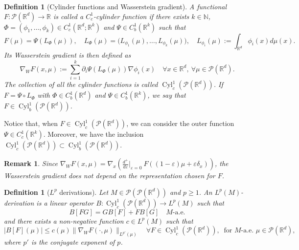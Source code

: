\documentclass[10pt,leqno]{amsart}
\numberwithin{equation}{section}
\newtheorem{df}[teorema]{Definition}
\newtheorem{oss}[teorema]{Remark}
\newcommand{\R}{\mathbb{R}}
\newcommand{\N}{\mathbb{N}}
\newcommand{\PP}{\mathcal{P}}
\begin{document}
\begin{df}[Cylinder functions and Wasserstein gradient]\label{def cyl func and wass grad}
    A functional $F:\PP(\R^d)\to\R$ is called a $C^1_c$-cylinder function if there exists $k\in \N$, $\Phi = (\phi_1,\dots,\phi_k)\in C^1_c(\R^d;\R^k)$ and $\Psi\in C^1_b(\R^k)$ such that 
    \begin{equation}\label{cyl functions}
        F(\mu) = \Psi\left( L_\Phi(\mu) \right), \quad L_\Phi(\mu) =  \big(L_{\phi_1}(\mu) ,\dots , L_{\phi_k}(\mu)\big), \quad  L_{\phi_i}(\mu) := \int_{\R^d} \phi_i(x) d\mu(x).
    \end{equation}
    Its Wasserstein gradient is then defined as 
    \begin{equation}\label{wass gradient cyl}
        \nabla_W F(x,\mu):= \sum_{i=1}^k \partial_{i}\Psi\left( L_{\Phi}(\mu)\right) \nabla \phi_i(x) \quad \forall x\in \R^d, \ \forall\mu \in \PP(\R^d).
    \end{equation}
    The collection of all the cylinder functions is called $\operatorname{Cyl}^1_c(\PP(\R^d))$. If $F = \Psi\circ L_\Phi$ with $\Phi \in C_b^1(\R^d)$ and $\Psi \in C_b^1(\R^k)$, we say that $F \in \operatorname{Cyl}^1_b(\PP(\R^d))$. 
\end{df}



Notice that, when $F\in \operatorname{Cyl}^1_c(\PP(\R^d))$, we can consider the outer function $\Psi \in C_c^1(\R^k)$. Moreover, we have the inclusion $\operatorname{Cyl}^1_c(\PP(\R^d))\subset \operatorname{Cyl}^1_b(\PP(\R^d)).$

\begin{oss}
    Since $\nabla_W F(x,\mu) = \nabla_x \left(\frac{d^+}{d\varepsilon}|_{\varepsilon=0} \ F((1-\varepsilon)\mu+ \varepsilon\delta_x)\right)$, the Wasserstein gradient does not depend on the representation chosen for $F$.
\end{oss}












\begin{df}[$L^p$ derivations]\label{def derivations}
    Let $M\in \PP(\PP(\R^d))$ and $p\geq 1$. An $L^p(M)$-derivation is a linear operator $B:\operatorname{Cyl}_c^1(\PP(\R^d))\to L^p(M)$ such that 
    \begin{equation}\label{leibniz rule}
        B[FG] = GB[F] + FB[G] \quad M\text{-a.e.} 
    \end{equation}
    and there exists a non-negative function $c\in L^p(M)$ such that 
    \begin{equation}\label{eq: int condition for derivations}
        |B[F](\mu)| \leq c(\mu) \|\nabla_WF(\cdot,\mu)\|_{L^{p'}(\mu)} \quad\forall F \in \operatorname{Cyl}_c^1(\PP(\R^d)), \ \text{ for } M\text{-a.e. } \mu \in \PP(\R^d),
    \end{equation}
    where $p'$ is the conjugate exponent of $p$.
\end{df}
\end{document}
